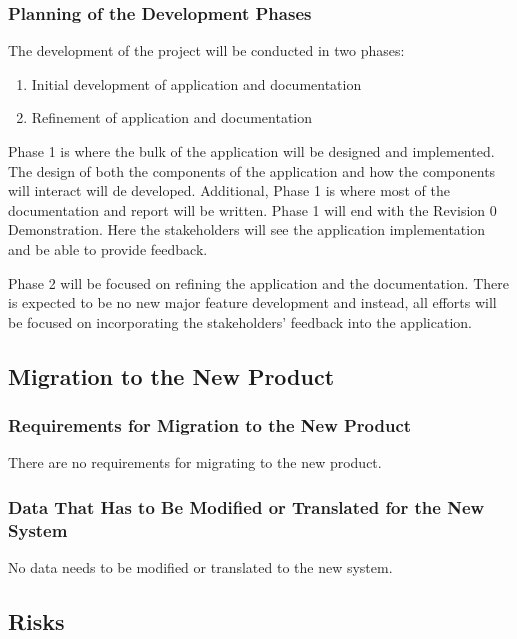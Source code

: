 \documentclass[12pt]{article}
\begin{document}
\subsubsection{Planning of the Development Phases}

The development of the project will be conducted in two phases:

\begin{enumerate}
	\item Initial development of application and documentation
	\item Refinement of application and documentation
\end{enumerate}

Phase 1 is where the bulk of the application will be designed and implemented. The design of both
the components of the application and how the components will interact will de developed.
Additional, Phase 1 is where most of the documentation and report will be written. Phase 1 will end
with the Revision 0 Demonstration. Here the stakeholders will see the application implementation
and be able to provide feedback.

Phase 2 will be focused on refining the application and the documentation. There is expected to be
no new major feature development and instead, all efforts will be focused on incorporating the
stakeholders' feedback into the application.

\subsection{Migration to the New Product}
\subsubsection{Requirements for Migration to the New Product}

There are no requirements for migrating to the new product.

\subsubsection{Data That Has to Be Modified or Translated for the New System}

No data needs to be modified or translated to the new system.

\subsection{Risks}
\end{document}
